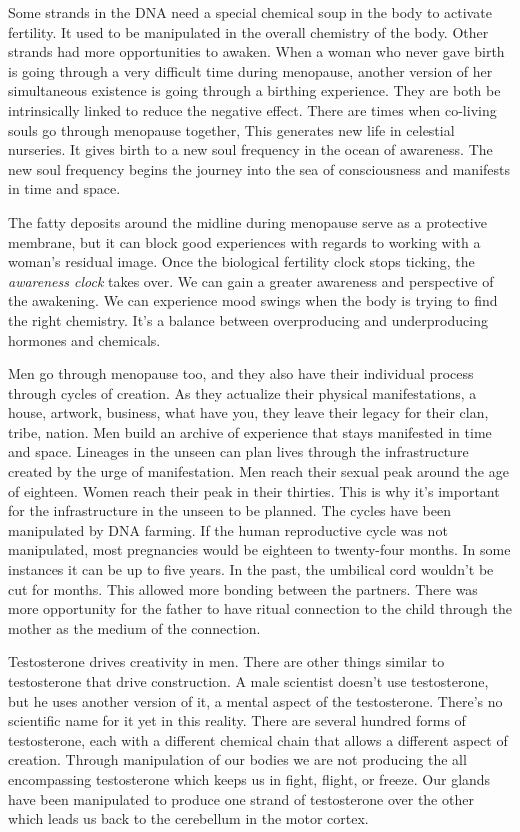 Some strands in the DNA need a special chemical soup in the body to
activate fertility. It used to be manipulated in the overall chemistry
of the body. Other strands had more opportunities to awaken. When a
woman who never gave birth is going through a very difficult time during
menopause, another version of her simultaneous existence is going
through a birthing experience. They are both be intrinsically linked to
reduce the negative effect. There are times when co-living souls go
through menopause together, This generates new life in celestial
nurseries. It gives birth to a new soul frequency in the ocean of
awareness. The new soul frequency begins the journey into the sea of
consciousness and manifests in time and space.

The fatty deposits around the midline during menopause serve as a
protective membrane, but it can block good experiences with regards to
working with a woman's residual image. Once the biological fertility
clock stops ticking, the \emph{awareness clock} takes over. We can gain
a greater awareness and perspective of the awakening. We can experience
mood swings when the body is trying to find the right chemistry. It's a
balance between overproducing and underproducing hormones and chemicals.

Men go through menopause too, and they also have their individual
process through cycles of creation. As they actualize their physical
manifestations, a house, artwork, business, what have you, they leave
their legacy for their clan, tribe, nation. Men build an archive of
experience that stays manifested in time and space. Lineages in the
unseen can plan lives through the infrastructure created by the urge of
manifestation. Men reach their sexual peak around the age of eighteen.
Women reach their peak in their thirties. This is why it's important for
the infrastructure in the unseen to be planned. The cycles have been
manipulated by DNA farming. If the human reproductive cycle was not
manipulated, most pregnancies would be eighteen to twenty-four months.
In some instances it can be up to five years. In the past, the umbilical
cord wouldn't be cut for months. This allowed more bonding between the
partners. There was more opportunity for the father to have ritual
connection to the child through the mother as the medium of the
connection.

Testosterone drives creativity in men. There are other things similar to
testosterone that drive construction. A male scientist doesn't use
testosterone, but he uses another version of it, a mental aspect of the
testosterone. There's no scientific name for it yet in this reality.
There are several hundred forms of testosterone, each with a different
chemical chain that allows a different aspect of creation. Through
manipulation of our bodies we are not producing the all encompassing
testosterone which keeps us in fight, flight, or freeze. Our glands have
been manipulated to produce one strand of testosterone over the other
which leads us back to the cerebellum in the motor cortex.


